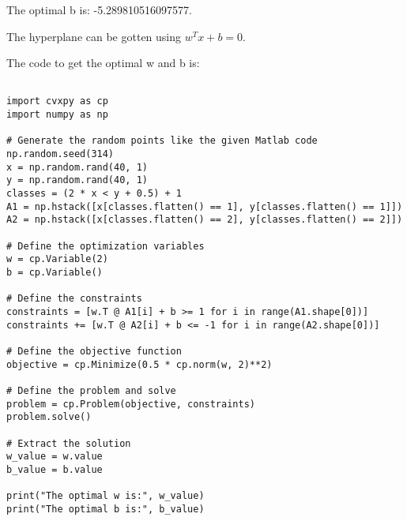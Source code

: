 \documentclass{article}
\begin{document}
The optimal b is: -5.289810516097577.

The hyperplane can be gotten using $w^T x + b = 0$.

The code to get the optimal w and b is:

\begin{lstlisting}

import cvxpy as cp
import numpy as np

# Generate the random points like the given Matlab code
np.random.seed(314)
x = np.random.rand(40, 1)
y = np.random.rand(40, 1)
classes = (2 * x < y + 0.5) + 1
A1 = np.hstack([x[classes.flatten() == 1], y[classes.flatten() == 1]])
A2 = np.hstack([x[classes.flatten() == 2], y[classes.flatten() == 2]])

# Define the optimization variables
w = cp.Variable(2)
b = cp.Variable()

# Define the constraints
constraints = [w.T @ A1[i] + b >= 1 for i in range(A1.shape[0])]
constraints += [w.T @ A2[i] + b <= -1 for i in range(A2.shape[0])]

# Define the objective function
objective = cp.Minimize(0.5 * cp.norm(w, 2)**2)

# Define the problem and solve
problem = cp.Problem(objective, constraints)
problem.solve()

# Extract the solution
w_value = w.value
b_value = b.value

print("The optimal w is:", w_value)
print("The optimal b is:", b_value)

\end{lstlisting}
\end{document}
